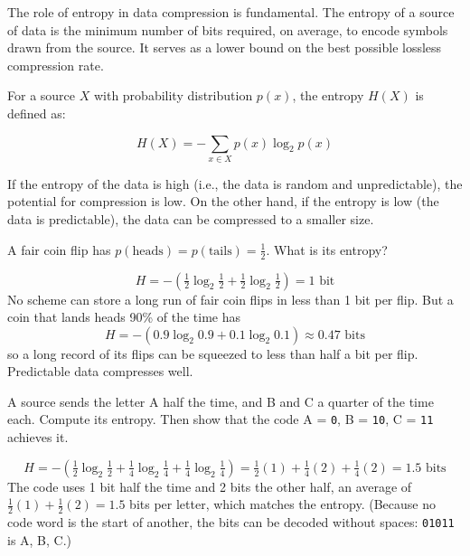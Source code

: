 The role of entropy in data compression is fundamental. The entropy of
a source of data is the minimum number of bits required, on average,
to encode symbols drawn from the source. It serves as a lower bound on
the best possible lossless compression rate.

For a source $X$ with  probability distribution $p(x)$, the entropy $H(X)$ is defined as:

\begin{equation}
H(X) = - \sum_{x \in X} p(x) \log_2 p(x)
\end{equation}

If the entropy of the data is high (i.e., the data is random and
unpredictable), the potential for compression is low. On the other
hand, if the entropy is low (the data is predictable), the data can be
compressed to a smaller size.

\begin{Worked}
\begin{Problem}
A fair coin flip has $p(\text{heads}) = p(\text{tails}) = \frac{1}{2}$. What is its entropy?
\end{Problem}
\begin{Solution}
$$H = -\left(\tfrac{1}{2}\log_2\tfrac{1}{2} + \tfrac{1}{2}\log_2\tfrac{1}{2}\right) = 1 \text{ bit}$$
No scheme can store a long run of fair coin flips in less than 1 bit per
flip. But a coin that lands heads 90\% of the time has
$$H = -(0.9\log_2 0.9 + 0.1\log_2 0.1) \approx 0.47 \text{ bits}$$
so a long record of its flips can be squeezed to less than half a bit per
flip. Predictable data compresses well.
\end{Solution}
\end{Worked}

\begin{Exercise}[title={Entropy of a Message}, label={ex:entropy}]
A source sends the letter A half the time, and B and C a quarter of the
time each. Compute its entropy. Then show that the code A = \texttt{0},
B = \texttt{10}, C = \texttt{11} achieves it.
\end{Exercise}
\begin{Answer}[ref={ex:entropy}]
$$H = -\left(\tfrac{1}{2}\log_2\tfrac{1}{2} + \tfrac{1}{4}\log_2\tfrac{1}{4} + \tfrac{1}{4}\log_2\tfrac{1}{4}\right) = \tfrac{1}{2}(1) + \tfrac{1}{4}(2) + \tfrac{1}{4}(2) = 1.5 \text{ bits}$$
The code uses 1 bit half the time and 2 bits the other half, an average of
$\frac{1}{2}(1) + \frac{1}{2}(2) = 1.5$ bits per letter, which matches the
entropy. (Because no code word is the start of another, the bits can be
decoded without spaces: \texttt{01011} is A, B, C.)
\end{Answer}
